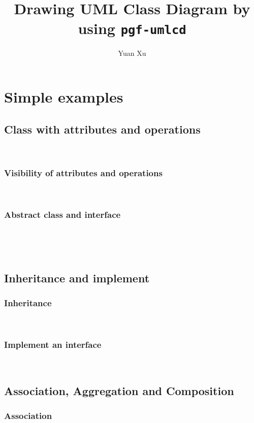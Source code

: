 \documentclass{article}
\newcommand{\demo}[1]{
\begin{minipage}{.5\linewidth}

\end{minipage}~~~~~~~~~~~~~~
\begin{minipage}{.45\linewidth}
\resizebox{\linewidth}{!}{

}
\end{minipage}
}
\begin{document}
\title{Drawing UML Class Diagram by using \texttt{pgf-umlcd}}
\author{Yuan Xu}
\maketitle

\tableofcontents

\section{Simple examples}
\subsection{Class with attributes and operations}
\demo{class}

\subsubsection{Visibility of attributes and operations}
\demo{visibility}

\subsubsection{Abstract class and interface}
\demo{abstract-class}
\demo{interface}

\subsection{Inheritance and implement}
\subsubsection{Inheritance}
\demo{inheritance}
 
\subsubsection{Implement an interface}
\demo{implement-interface}

\subsection{Association, Aggregation and Composition}
\subsubsection{Association} 
\demo{association}
 
\end{document}
